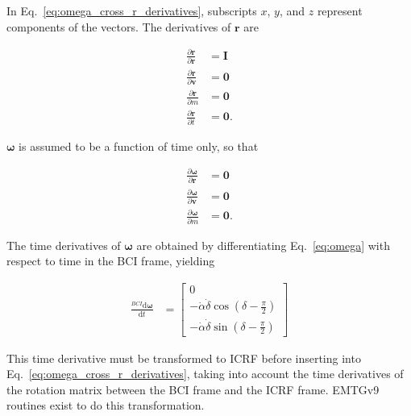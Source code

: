 \documentclass[]{article}
\newcommand{\vb}[1]{\bm{#1}} %
\newcommand{\pd}[2]{\frac{\partial #1}{\partial #2}} %
\begin{document}
\noindent In Eq.~\eqref{eq:omega_cross_r_derivatives}, subscripts $x$, $y$, and $z$ represent components of the vectors. The derivatives of $\vb{r}$ are

\begin{align}
	\pd{\vb{r}}{\vb{r}} &= \vb{I} \\
	\pd{\vb{r}}{\vb{v}} &= \vb{0} \\
	\pd{\vb{r}}{m} &= \vb{0} \\
	\pd{\vb{r}}{t} &= \vb{0}.
\end{align}

$\vb{\omega}$ is assumed to be a function of time only, so that

\begin{align}
	\pd{\vb{\omega}}{\vb{r}} &= \vb{0} \\
	\pd{\vb{\omega}}{\vb{v}} &= \vb{0} \\
	\pd{\vb{\omega}}{m} &= \vb{0}.
\end{align}

\noindent The time derivatives of $\vb{\omega}$ are obtained by differentiating Eq.~\eqref{eq:omega} with respect to time in the BCI frame, yielding

\begin{align}
	\frac{^{BCI} \mathrm{d} \vb{\omega}}{\mathrm{d} t} &= \left[ \begin{array}{c}
	0 \\
	- \dot{\alpha} \dot{\delta} \cos \left( \delta - \frac{\pi}{2} \right) \\
	- \dot{\alpha} \dot{\delta} \sin \left( \delta -\frac{\pi}{2} \right) \end{array} \right]
\end{align}

\noindent This time derivative must be transformed to ICRF before inserting into Eq.~\eqref{eq:omega_cross_r_derivatives}, taking into account the time derivatives of the rotation matrix between the BCI frame and the ICRF frame. EMTGv9 routines exist to do this transformation.










\end{document}

